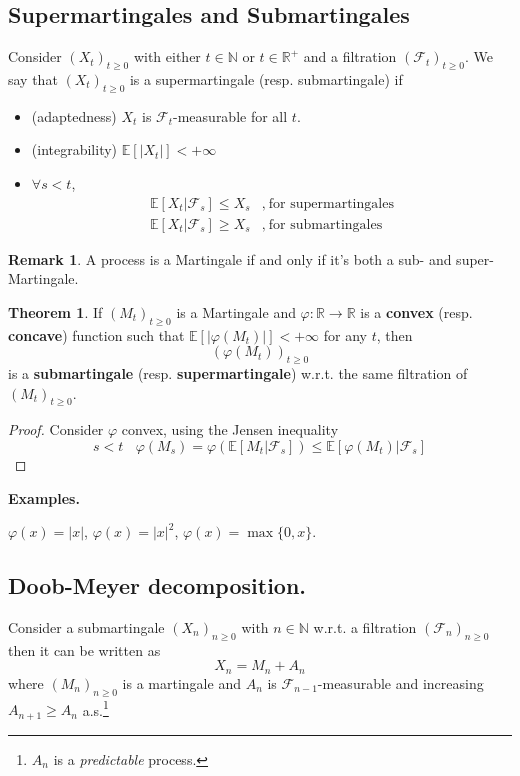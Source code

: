 \documentclass[10pt,a4paper]{article}
\theoremstyle{definition}
\newtheorem{teo}{Theorem}[section]
\newtheorem*{rem}{Remark}
\begin{document}
\subsection{Supermartingales and Submartingales}

Consider $( X_{t})_{t\geq 0}$ with either $t\in \mathbb{N}$ or $t\in \mathbb{R}^{+}$ and a filtration $(\mathcal{F}_{t})_{t\geq 0}$. We say that $( X_{t})_{t\geq 0}$ is a supermartingale (resp. submartingale) if
\begin{itemize}
	\item (adaptedness) $X_{t}$ is $\mathcal{F}_{t}$-measurable for all $t$.
	\item (integrability) $\mathbb{E}[| X_{t}| ] < +\infty $
	\item $\forall s< t$,\begin{align*}
	      \mathbb{E}[ X_{t} |\mathcal{F}_{s}] \leq X_{s} & ,\ \text{for supermartingales}\\
	      \mathbb{E}[ X_{t} |\mathcal{F}_{s}] \geq X_{s} & ,\ \text{for submartingales}
	\end{align*}
\end{itemize}
\begin{rem}
	A process is a Martingale if and only if it's both a sub- and super- Martingale.
\end{rem}
\begin{teo}
	If $( M_{t})_{t\geq 0}$ is a Martingale and $\varphi :\mathbb{R}\rightarrow \mathbb{R}$ is a \textbf{convex} (resp. \textbf{concave}) function such that $\mathbb{E}[| \varphi ( M_{t})| ] < +\infty $ for any $t$, then
	\begin{equation*}
		( \varphi ( M_{t}))_{t\geq 0}
	\end{equation*}
	is a \textbf{submartingale} (resp. \textbf{supermartingale}) w.r.t. the same filtration of $( M_{t})_{t\geq 0}$.
\end{teo}
\begin{proof}
	Consider $\varphi $ convex, using the Jensen inequality
	\begin{equation*}
		s< t\ \ \ \ \varphi ( M_{s}) =\varphi (\mathbb{E}[ M_{t} |\mathcal{F}_{s}]) \leq \mathbb{E}[ \varphi ( M_{t}) |\mathcal{F}_{s}]
	\end{equation*}
\end{proof}
\textbf{Examples.}

$\varphi ( x) =| x| $, $\varphi ( x) =| x| ^{2}$, $\varphi ( x) =\max\{0,x\}$.
\subsection{Doob-Meyer decomposition.}

Consider a submartingale $( X_{n})_{n\geq 0}$ with $n\in \mathbb{N}$ w.r.t. a filtration $(\mathcal{F}_{n})_{n\geq 0}$ then it can be written as
\begin{equation*}
	X_{n} =M_{n} +A_{n}
\end{equation*}
where $( M_{n})_{n\geq 0}$ is a martingale and $A_{n}$ is $\mathcal{F}_{n-1}$-measurable and increasing $A_{n+1} \geq A_{n}$ a.s.\footnote{$A_{n}$ is a \textit{predictable} process.}
\end{document}
